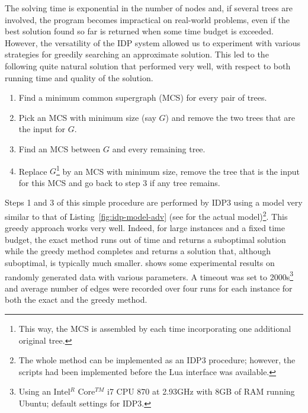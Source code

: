 \documentclass{tlp}
\newcommand{\idpdrie}{{\sc IDP3}\xspace}
\renewcommand{\|}{\ensuremath{\,|\,}}
\renewcommand{\|}{\,|\,}
\begin{document}
The solving time is exponential in the number of nodes and, if several
trees are involved, the program becomes impractical on real-world
problems, even if the best solution found so far is returned when some
time budget is exceeded. However, the versatility of the IDP system
allowed us to experiment with various strategies for greedily
searching an approximate solution.  This led to the following quite
natural solution that performed very well, with respect to both
running time and quality of the solution.
\begin{enumerate}
\item Find a minimum common supergraph (MCS) for every pair of trees.
\item Pick an MCS with minimum size (say $G$) and remove the two trees
   that are the input for $G$.
\item Find an MCS between $G$ and every remaining tree.
\item Replace $G$\footnote{This way, the MCS is assembled by each time incorporating one additional original tree.} by an MCS with minimum size, remove the tree
  that is the input for this MCS and go back to step 3 if any tree remains.
\end{enumerate}


Steps 1 and 3 of this simple procedure are performed by \idpdrie using a
model very similar to that of Listing~\ref{fig:idp-model-adv} (see
 for the actual model)\footnote{The whole method can be
  implemented as an \idpdrie procedure; however, the scripts had been
  implemented before the Lua interface was available.}. This greedy
approach works very well. Indeed, for large instances and a fixed time
budget, the exact method runs out of time and returns a suboptimal
solution while the greedy method completes and returns a solution
that, although suboptimal, is typically much
smaller.  shows some experimental results on
randomly generated data with various parameters. A timeout was set to
2000s\footnote{Using an Intel$^R$ Core$^{TM}$ i7 CPU 870 at 2.93GHz
   with 8GB of RAM running Ubuntu; default settings for \idpdrie.}
and average number of edges were recorded over four runs for each
instance for both the exact and the greedy method.
\end{document}
